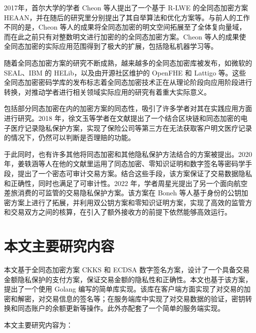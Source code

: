 2017年，首尔大学的学者 Cheon 等人提出了一个基于 R-LWE 的全同态加密方案 HEAAN\cite{cryptoeprint:2016/421}，并在随后的研究里分别提出了其自举算法和优化方案等\cite{cryptoeprint:2018/153,cryptoeprint:2018/931}。与前人的工作不同的是，Cheon 等人的成果将全同态加密的明文空间拓展至了全体复向量域，而在此之前只有对整数明文进行加密的的全同态加密方案。Cheon 等人的成果使全同态加密的实际应用范围得到了极大的扩展，包括隐私机器学习等。\cite{FL_HE}

随着全同态加密方案的研究不断成熟，越来越多的全同态加密库被发布，如微软的 SEAL\cite{sealcrypto}、IBM 的 HELib，以及由开源社区维护的 OpenFHE\cite{OpenFHE} 和 Lattigo\cite{Mouchet2020LattigoAM} 等。这些全同态加密密码学库的发布标志着全同态加密技术正在从理论阶段向应用阶段进行转换\cite{ZQL-SEAL}，对推动学者进行相关领域实际应用的研究有着重大实际意义。

包括部分同态加密在内的加密方案的同态性，吸引了许多学者对其在实践应用方面进行研究。2018 年，徐文玉等学者在文献\cite{Homo_Medi}提出了一个结合区块链和同态加密的电子医疗记录隐私保护方案，实现了保险公司等第三方在无法获取客户明文医疗记录的情况下，仍然可以判断是否理赔的功能。

于此同时，也有许多其他将同态加密和其他隐私保护方法结合的方案被提出。2020 年，姜轶涵等人在他的文献里\cite{ACT}运用了同态加密、零知识证明和数字签名等密码学手段，提出了一个密态可审计交易方案。结合这些手段，该方案保证了交易数据隐私和正确性，同时也满足了可审计性。2022 年，学者周星光提出了另一个面向航空差旅消费的可监管的交易隐私保护方案。\cite{ZXG_Air_privacy}该方案在 Boneh 等人基于身份的公钥加密方案上进行了拓展，并利用双公钥方案和零知识证明方案，实现了高效的监管方和交易双方之间的核算，在引入了额外接收方的前提下依然能够高效运行。

\section{本文主要研究内容}

本文基于全同态加密方案 CKKS\cite{cryptoeprint:2016/421} 和 ECDSA 数字签名方案，设计了一个具备交易金额隐私保护的支付方案，保证交易金额的隐私性和正确性。本文也基于该方案，提出了一个使用 Golang 编写的简单库实现。该库在客户端方面实现了对交易的加密和解密，对交易信息的签名等；在服务端库中实现了对交易数据的验证，密钥转换和同态账户的余额更新等操作。此外亦配套了一个简单的服务端实现。

本文主要研究内容为：

